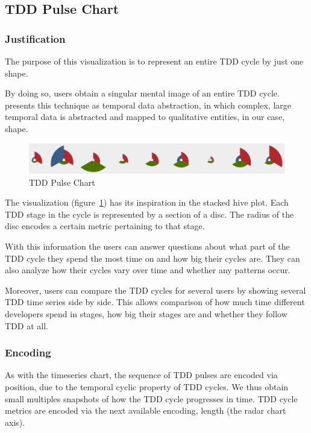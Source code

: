 \documentclass[journal]{vgtc}                %
\begin{document}
\subsection{TDD Pulse Chart}
\label{sec:pulse}

\subsubsection{Justification}

The purpose of this visualization is to represent an entire TDD cycle by just one shape. 

By doing so, users obtain a singular mental image of an entire TDD cycle.
\cite{one} presents this technique as temporal data abstraction, in which complex, large temporal data is abstracted and mapped to qualitative entities, in our case, shape.

\begin{figure}
	\includegraphics[width=\textwidth]{fig3.png}
	\caption{TDD Pulse Chart}
	\label{fig:three}
\end{figure}

The visualization (figure~\ref{fig:three}) has its inspiration in the stacked hive plot.
Each TDD stage in the cycle is represented by a section of a disc.
The radius of the disc encodes a certain metric pertaining to that stage.

With this information the users can answer questions about what part of the TDD cycle they spend the most time on and how big their cycles are. They can also analyze how their cycles vary over time and whether any patterns occur.

Moreover, users can compare the TDD cycles for several users by showing several TDD time series side by side. This allows comparison of how much time different developers spend in stages, how big their stages are and whether they follow TDD at all.

\subsubsection{Encoding}

As with the timeseries chart, the sequence of TDD pulses are encoded via position, due to the temporal cyclic property of TDD cycles. We thus obtain small multiples snapshots of how the TDD cycle progresses in time.
TDD cycle metrics are encoded via the next available encoding, length (the radar chart axis).
\end{document}
